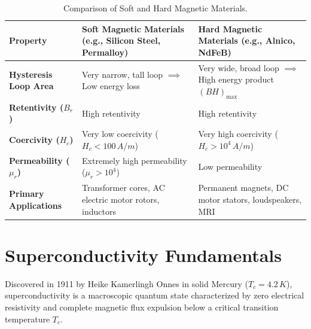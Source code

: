 \begin{table}[htbp]
\centering
\small
\renewcommand{\arraystretch}{1.3}
\begin{tabularx}{\linewidth}{lXX}
\toprule
\textbf{Property} & \textbf{Soft Magnetic Materials (e.g., Silicon Steel, Permalloy)} & \textbf{Hard Magnetic Materials (e.g., Alnico, NdFeB)} \\
\midrule
\textbf{Hysteresis Loop Area} & Very narrow, tall loop $\implies$ Low energy loss & Very wide, broad loop $\implies$ High energy product $(BH)_{\text{max}}$ \\
\textbf{Retentivity ($B_r$)} & High retentivity & High retentivity \\
\textbf{Coercivity ($H_c$)} & Very low coercivity ($H_c < 100\,\si{A/m}$) & Very high coercivity ($H_c > 10^4\,\si{A/m}$) \\
\textbf{Permeability ($\mu_r$)} & Extremely high permeability ($\mu_r > 10^4$) & Low permeability \\
\textbf{Primary Applications} & Transformer cores, AC electric motor rotors, inductors & Permanent magnets, DC motor stators, loudspeakers, MRI \\
\bottomrule
\end{tabularx}
\caption{Comparison of Soft and Hard Magnetic Materials.}
\label{tab:soft-vs-hard-magnetic}
\end{table}

\section{Superconductivity Fundamentals}

Discovered in 1911 by Heike Kamerlingh Onnes in solid Mercury ($T_c = 4.2\,\si{K}$), superconductivity is a macroscopic quantum state characterized by zero electrical resistivity and complete magnetic flux expulsion below a critical transition temperature $T_c$.

